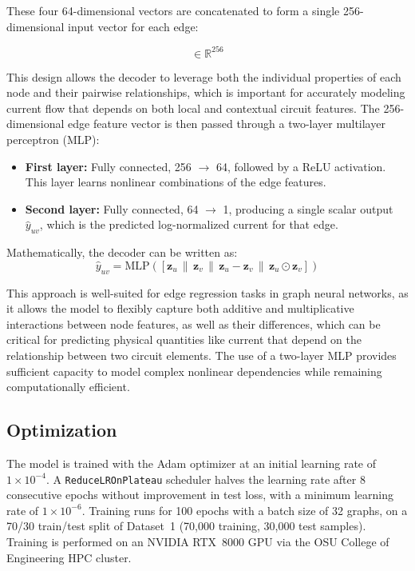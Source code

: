 \documentclass[10pt,twocolumn,letterpaper]{article}
\begin{document}
These four 64-dimensional vectors are concatenated to form a single 256-dimensional input vector for each edge:

\begin{equation}
  [\mathbf{z}_u \,\|\, \mathbf{z}_v \,\|\, \mathbf{z}_u - \mathbf{z}_v \,\|\, \mathbf{z}_u \odot \mathbf{z}_v] \in \mathbb{R}^{256}
\end{equation}

This design allows the decoder to leverage both the individual properties of each node and their pairwise relationships, which is important for accurately modeling current flow that depends on both local and contextual circuit features. The 256-dimensional edge feature vector is then passed through a two-layer multilayer perceptron (MLP):

\begin{itemize}
  \item \textbf{First layer:} Fully connected, 256 $\rightarrow$ 64, followed by a ReLU activation. This layer learns nonlinear combinations of the edge features.
  \item \textbf{Second layer:} Fully connected, 64 $\rightarrow$ 1, producing a single scalar output $\hat{y}_{uv}$, which is the predicted log-normalized current for that edge.
\end{itemize}

Mathematically, the decoder can be written as:
\begin{equation}
  \hat{y}_{uv} = \mathrm{MLP}\!\left([\mathbf{z}_u \,\|\, \mathbf{z}_v \,\|\, \mathbf{z}_u - \mathbf{z}_v \,\|\, \mathbf{z}_u \odot \mathbf{z}_v]\right)
\end{equation}

This approach is well-suited for edge regression tasks in graph neural networks, as it allows the model to flexibly capture both additive and multiplicative interactions between node features, as well as their differences, which can be critical for predicting physical quantities like current that depend on the relationship between two circuit elements. The use of a two-layer MLP provides sufficient capacity to model complex nonlinear dependencies while remaining computationally efficient.

\subsection{Optimization}
\label{subsec:optimization}

The model is trained with the Adam optimizer at an initial learning rate of $1 \times 10^{-4}$. A \texttt{ReduceLROnPlateau} scheduler halves the learning rate after 8 consecutive epochs without improvement in test loss, with a minimum learning rate of $1 \times 10^{-6}$. Training runs for 100 epochs with a batch size of 32 graphs, on a 70/30 train/test split of Dataset~1 (70,000 training, 30,000 test samples). Training is performed on an NVIDIA RTX~8000 GPU via the OSU College of Engineering HPC cluster.
\end{document}
